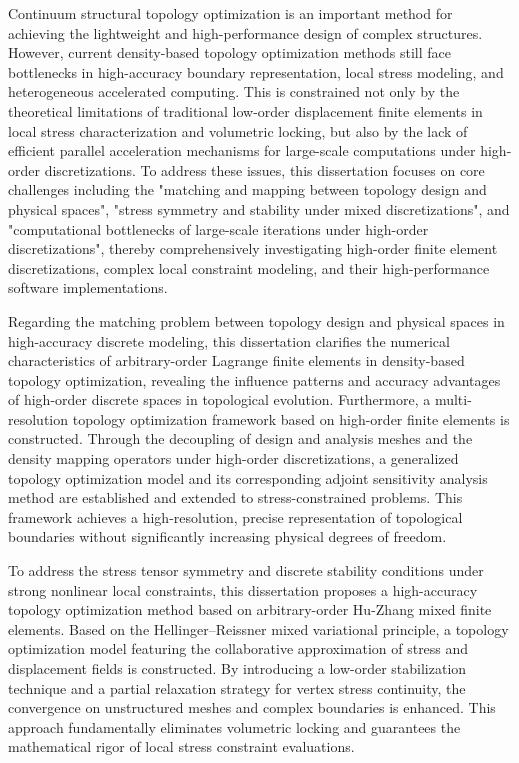 \newpage
\begin{enabstract}
	
	Continuum structural topology optimization is an important method for achieving the lightweight and high-performance design of complex structures. However, current density-based topology optimization methods still face bottlenecks in high-accuracy boundary representation, local stress modeling, and heterogeneous accelerated computing. This is constrained not only by the theoretical limitations of traditional low-order displacement finite elements in local stress characterization and volumetric locking, but also by the lack of efficient parallel acceleration mechanisms for large-scale computations under high-order discretizations. To address these issues, this dissertation focuses on core challenges including the "matching and mapping between topology design and physical spaces", "stress symmetry and stability under mixed discretizations", and "computational bottlenecks of large-scale iterations under high-order discretizations", thereby comprehensively investigating high-order finite element discretizations, complex local constraint modeling, and their high-performance software implementations.
	
	Regarding the matching problem between topology design and physical spaces in high-accuracy discrete modeling, this dissertation clarifies the numerical characteristics of arbitrary-order Lagrange finite elements in density-based topology optimization, revealing the influence patterns and accuracy advantages of high-order discrete spaces in topological evolution. Furthermore, a multi-resolution topology optimization framework based on high-order finite elements is constructed. Through the decoupling of design and analysis meshes and the density mapping operators under high-order discretizations, a generalized topology optimization model and its corresponding adjoint sensitivity analysis method are established and extended to stress-constrained problems. This framework achieves a high-resolution, precise representation of topological boundaries without significantly increasing physical degrees of freedom.
	
	To address the stress tensor symmetry and discrete stability conditions under strong nonlinear local constraints, this dissertation proposes a high-accuracy topology optimization method based on arbitrary-order Hu-Zhang mixed finite elements. Based on the Hellinger–Reissner mixed variational principle, a topology optimization model featuring the collaborative approximation of stress and displacement fields is constructed. By introducing a low-order stabilization technique and a partial relaxation strategy for vertex stress continuity, the convergence on unstructured meshes and complex boundaries is enhanced. This approach fundamentally eliminates volumetric locking and guarantees the mathematical rigor of local stress constraint evaluations.
	

\end{enabstract}
